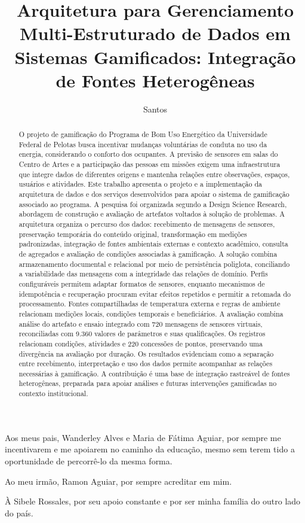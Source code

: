 \documentclass[tcc,capa]{texufpel}
\title{Arquitetura para Gerenciamento Multi-Estruturado de Dados em Sistemas Gamificados: Integração de Fontes Heterogêneas}
\author{Santos}{Rávilon Aguiar dos}
\begin{document}
\renewcommand{\advisorname}{Orientador}
\renewcommand{\coadvisorname}{Coorientadora}
\maketitle
\sloppy

\begin{dedicatoria}
\thispagestyle{empty}
Aos meus pais, Wanderley Alves e Maria de Fátima Aguiar, por sempre me incentivarem e me apoiarem no caminho da educação, mesmo sem terem tido a oportunidade de percorrê-lo da mesma forma.

Ao meu irmão, Ramon Aguiar, por sempre acreditar em mim.

À Sibele Rossales, por seu apoio constante e por ser minha família do outro lado do país.
\end{dedicatoria}

\begin{abstract}
O projeto de gamificação do Programa de Bom Uso Energético da Universidade Federal de Pelotas busca incentivar mudanças voluntárias de conduta no uso da energia, considerando o conforto dos ocupantes. A previsão de sensores em salas do Centro de Artes e a participação das pessoas em missões exigem uma infraestrutura que integre dados de diferentes origens e mantenha relações entre observações, espaços, usuários e atividades. Este trabalho apresenta o projeto e a implementação da arquitetura de dados e dos serviços desenvolvidos para apoiar o sistema de gamificação associado ao programa. A pesquisa foi organizada segundo a Design Science Research, abordagem de construção e avaliação de artefatos voltados à solução de problemas. A arquitetura organiza o percurso dos dados: recebimento de mensagens de sensores, preservação temporária do conteúdo original, transformação em medições padronizadas, integração de fontes ambientais externas e contexto acadêmico, consulta de agregados e avaliação de condições associadas à gamificação. A solução combina armazenamento documental e relacional por meio de persistência poliglota, conciliando a variabilidade das mensagens com a integridade das relações de domínio. Perfis configuráveis permitem adaptar formatos de sensores, enquanto mecanismos de idempotência e recuperação procuram evitar efeitos repetidos e permitir a retomada do processamento. Fontes compartilhadas de temperatura externa e regras de ambiente relacionam medições locais, condições temporais e beneficiários. A avaliação combina análise do artefato e ensaio integrado com 720 mensagens de sensores virtuais, reconciliadas com 9.360 valores de parâmetros e suas qualificações. Os registros relacionam condições, atividades e 220 concessões de pontos, preservando uma divergência na avaliação por duração. Os resultados evidenciam como a separação entre recebimento, interpretação e uso dos dados permite acompanhar as relações necessárias à gamificação. A contribuição é uma base de integração rastreável de fontes heterogêneas, preparada para apoiar análises e futuras intervenções gamificadas no contexto institucional.
\end{abstract}
\end{document}
